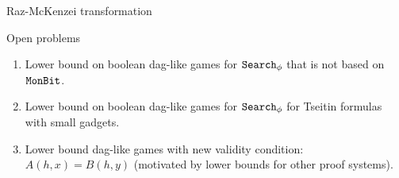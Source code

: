 \begin{frame}{Raz-McKenzei transformation}
    
\end{frame}

\begin{frame}{Open problems}
    \begin{enumerate}
        \pause
        \item Lower bound on boolean dag-like games for $\mathtt{Search}_{\phi}$ that is not based on $\mathtt{MonBit}$.
        \pause
        \item Lower bound on boolean dag-like games for $\mathtt{Search}_{\phi}$ for Tseitin formulas with small gadgets.
        \pause
        \item Lower bound dag-like games with new validity condition: $A(h, x) = B(h, y)$ (motivated by lower bounds for
            other proof systems).
    \end{enumerate}
\end{frame}
